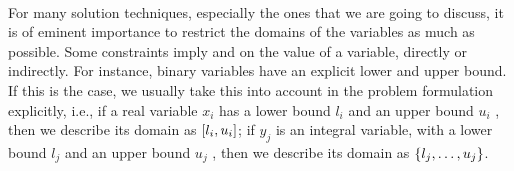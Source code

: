 \begin{definition}
\paragraph{}
For many solution techniques, especially the ones that we are going to discuss, it is of eminent importance to restrict the domains of the variables as much as possible. Some constraints imply  and  on the value of a variable, directly or indirectly. For instance, binary variables have an explicit lower and upper bound. If this is the case, we usually take this into account in the problem formulation explicitly, i.e., if a real variable $x_i$ has a lower bound $l_i$ and an upper bound $u_i$ , then we describe its domain as $\left[ l_i,u_i \right]$; if $y_j$ is an integral variable, with a lower bound $l_j$ and an upper bound $u_j$ , then we describe its domain as $\left\{ l_j,\ldots,u_j \right\}$.


\end{definition}

